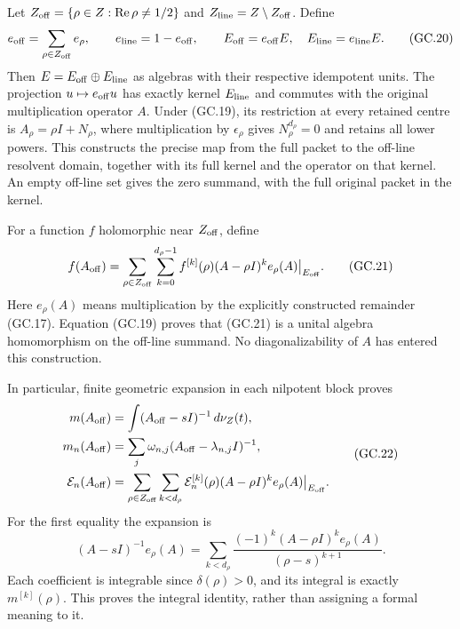 Let \(Z_{\rm off}=\{\rho\in Z:\operatorname{Re}\rho\ne1/2\}\)
and \(Z_{\rm line}=Z\setminus Z_{\rm off}\).  Define
\[
 e_{\rm off}=\sum_{\rho\in Z_{\rm off}}e_\rho,\qquad
 e_{\rm line}=1-e_{\rm off},\qquad
 E_{\rm off}=e_{\rm off}E,\quad E_{\rm line}=e_{\rm line}E.
                                                        \tag{GC.20}
\]
Then \(E=E_{\rm off}\oplus E_{\rm line}\) as algebras with
their respective idempotent units.  The projection
\(u\mapsto e_{\rm off}u\) has exactly kernel \(E_{\rm line}\)
and commutes with the original multiplication operator \(A\).
Under (GC.19), its restriction at every retained centre is
\(A_\rho=\rho I+N_\rho\), where multiplication by
\(\epsilon_\rho\) gives \(N_\rho^{d_\rho}=0\) and retains all
lower powers.  This constructs the precise map from the full
packet to the off-line resolvent domain, together with its full
kernel and the operator on that kernel.  An empty off-line set
gives the zero summand, with the full original packet in the kernel.

For a function \(f\) holomorphic near \(Z_{\rm off}\), define
\[
 f(A_{\rm off})=
  \sum_{\rho\in Z_{\rm off}}\sum_{k=0}^{d_\rho-1}
     f^{[k]}(\rho)(A-\rho I)^k e_\rho(A)\big|_{E_{\rm off}}.
                                                        \tag{GC.21}
\]
Here \(e_\rho(A)\) means multiplication by the explicitly
constructed remainder (GC.17).  Equation (GC.19) proves that
(GC.21) is a unital algebra homomorphism on the off-line summand.
No diagonalizability of \(A\) has entered this construction.

In particular, finite geometric expansion in each nilpotent block
proves
\[
 \begin{split}
 m(A_{\rm off})
   &=\int(A_{\rm off}-sI)^{-1}\,d\nu_Z(t),\\
 m_n(A_{\rm off})
   &=\sum_j\omega_{n,j}(A_{\rm off}-\lambda_{n,j}I)^{-1},\\
 \mathcal E_n(A_{\rm off})
   &=\sum_{\rho\in Z_{\rm off}}\sum_{k<d_\rho}
     \mathcal E_n^{[k]}(\rho)(A-\rho I)^ke_\rho(A)
                              \big|_{E_{\rm off}}.
 \end{split}                                           \tag{GC.22}
\]
For the first equality the expansion is
\[
 (A-sI)^{-1}e_\rho(A)=
  \sum_{k<d_\rho}\frac{(-1)^k(A-\rho I)^ke_\rho(A)}
                             {(\rho-s)^{k+1}}.
\]
Each coefficient is integrable since \(\delta(\rho)>0\), and
its integral is exactly \(m^{[k]}(\rho)\).  This proves the
integral identity, rather than assigning a formal meaning to it.


